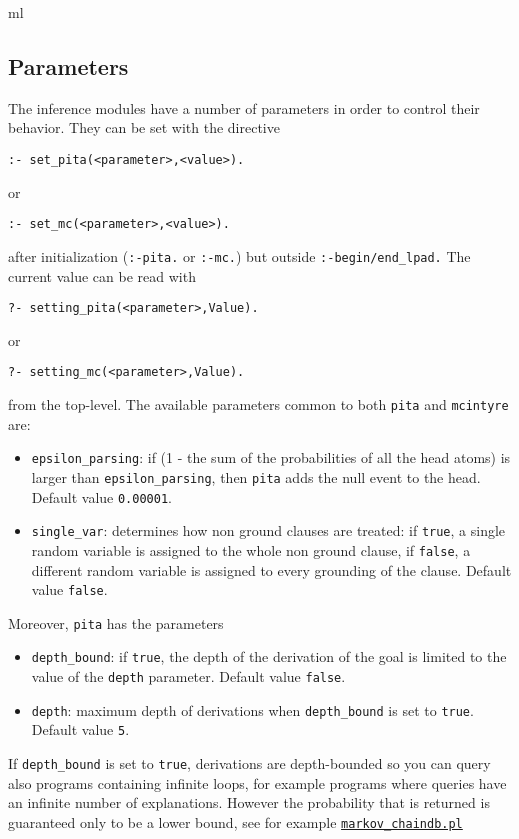 ml\subsection{Parameters}
The inference modules have a number of parameters in order to control their behavior. They can be set with the directive
\begin{verbatim}
:- set_pita(<parameter>,<value>).
\end{verbatim}
or
\begin{verbatim}
:- set_mc(<parameter>,<value>).
\end{verbatim}
after initialization (\verb|:-pita.| or \verb|:-mc.|) but outside \verb|:-begin/end_lpad.|
The current value can be read with
\begin{verbatim}
?- setting_pita(<parameter>,Value).
\end{verbatim}
or
\begin{verbatim}
?- setting_mc(<parameter>,Value).
\end{verbatim}
from the top-level.
The available parameters common to both \verb|pita| and \verb|mcintyre| are:
\begin{itemize}
\item 
	 \verb|epsilon_parsing|: if (1 - the sum of the probabilities of all the head atoms) is larger than 
    \verb|epsilon_parsing|,
		then \texttt{pita} adds the null event to the head. Default value \texttt{0.00001}.
\item \verb|single_var|: determines how non ground clauses are treated: if \texttt{true}, a single random variable is assigned to the whole non ground clause, 
if \texttt{false}, a different random variable is assigned to every grounding of the clause. Default value \texttt{false}.
\end{itemize}
Moreover, \verb|pita| has the parameters
\begin{itemize}
\item \verb|depth_bound|: if \texttt{true}, the depth of the derivation of the goal is limited to the value of the \texttt{depth} parameter.  Default value \texttt{false}.
\item  \texttt{depth}: maximum depth of derivations when  \verb|depth_bound| is set to \texttt{true}. Default value \texttt{5}.
\end{itemize}
If \verb|depth_bound| is set to \verb|true|, derivations are depth-bounded so you can query also programs
containing infinite loops, for example programs where queries have an infinite number of explanations. However the probability that is returned is guaranteed only to be a lower bound,
see for example \href{http://cplint.ml.unife.it/example/inference/markov_chaindb.pl}{\texttt{markov\_chaindb.pl}}


